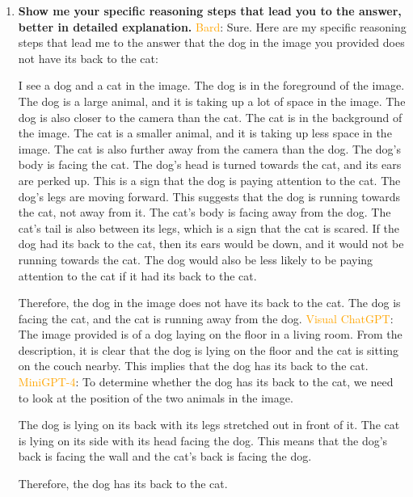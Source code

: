 \begin{enumerate}
    Therefore, the dog in the image does not have its back to the cat.
    \subitem \textcolor{orange}{Visual ChatGPT}: Yes, the dog has its back to the cat.
    \subitem \textcolor{orange}{MiniGPT-4}: Yes, the dog has its back to the cat in the image.
    \item \textbf{Show me your specific reasoning steps that lead you to the answer, better in detailed explanation.}
    \subitem \textcolor{orange}{Bard}: Sure. Here are my specific reasoning steps that lead me to the answer that the dog in the image you provided does not have its back to the cat:

    I see a dog and a cat in the image.
    The dog is in the foreground of the image. The dog is a large animal, and it is taking up a lot of space in the image. The dog is also closer to the camera than the cat.
    The cat is in the background of the image. The cat is a smaller animal, and it is taking up less space in the image. The cat is also further away from the camera than the dog.
    The dog's body is facing the cat. The dog's head is turned towards the cat, and its ears are perked up. This is a sign that the dog is paying attention to the cat.
    The dog's legs are moving forward. This suggests that the dog is running towards the cat, not away from it.
    The cat's body is facing away from the dog. The cat's tail is also between its legs, which is a sign that the cat is scared.
    If the dog had its back to the cat, then its ears would be down, and it would not be running towards the cat. The dog would also be less likely to be paying attention to the cat if it had its back to the cat.
    
    Therefore, the dog in the image does not have its back to the cat.
    The dog is facing the cat, and the cat is running away from the dog.
    \subitem \textcolor{orange}{Visual ChatGPT}: The image provided is of a dog laying on the floor in a living room. From the description, it is clear that the dog is lying on the floor and the cat is sitting on the couch nearby. This implies that the dog has its back to the cat.
    \subitem \textcolor{orange}{MiniGPT-4}: To determine whether the dog has its back to the cat, we need to look at the position of the two animals in the image.

    The dog is lying on its back with its legs stretched out in front of it. The cat is lying on its side with its head facing the dog. This means that the dog’s back is facing the wall and the cat’s back is facing the dog.
    
    Therefore, the dog has its back to the cat.
\end{enumerate}
